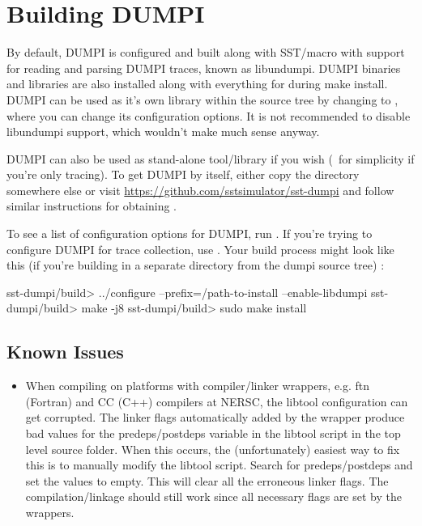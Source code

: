 \section{Building DUMPI}
\label{sec:building:dumpi}

By default, DUMPI is configured and built along with SST/macro with support for reading and parsing DUMPI traces, known as libundumpi.  
DUMPI binaries and libraries are also installed along with everything for \sstmacro during make install.   
DUMPI can be used as it's own library within the \sstmacro source tree by changing to , 
where you can change its configuration options.  
It is not recommended to disable libundumpi support, which wouldn't make much sense anyway. 

DUMPI can also be used as stand-alone tool/library if you wish (\eg~for simplicity if you're only tracing). 
To get DUMPI by itself, either copy the  directory somewhere else or visit \url{https://github.com/sstsimulator/sst-dumpi} and follow similar instructions for obtaining \sstmacro.

To see a list of configuration options for DUMPI, run .  
If you're trying to configure DUMPI for trace collection, use .
Your build process might look like this (if you're building in a separate directory from the dumpi source tree) :

\begin{ShellCmd}
sst-dumpi/build> ../configure --prefix=/path-to-install --enable-libdumpi
sst-dumpi/build> make -j8
sst-dumpi/build> sudo make install
\end{ShellCmd}

\subsection{Known Issues}
\label{subsubsec:building:dumpi:issues}

\begin{itemize}
\item When compiling on platforms with compiler/linker wrappers, e.g. ftn (Fortran) and CC (C++) compilers 
at NERSC, the libtool configuration can get corrupted.  The linker flags automatically added by the 
wrapper produce bad values for the predeps/postdeps variable in the libtool script in the top 
level source folder.  When this occurs, the (unfortunately) easiest way to fix this is to manually modify
the libtool script.  Search for predeps/postdeps and set the values to empty.
This will clear all the erroneous linker flags.  The compilation/linkage should still work since 
all necessary flags are set by the wrappers. 
\end{itemize}

